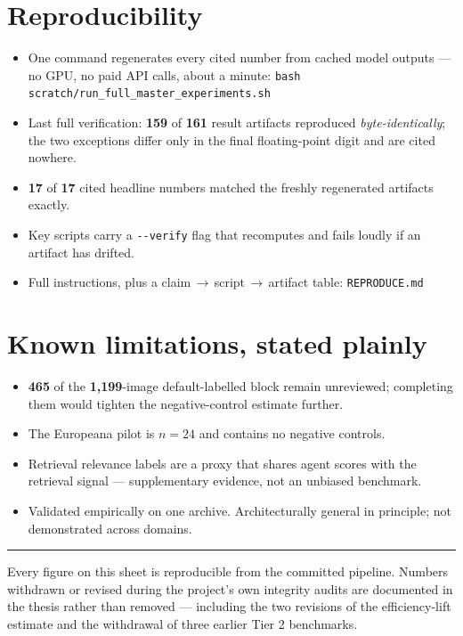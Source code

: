 \documentclass[10pt,a4paper]{article}
\newcommand{\num}[1]{\textbf{#1}}
\begin{document}
\section{Reproducibility}
\begin{itemize}
  \item One command regenerates every cited number from cached model outputs --- no GPU, no paid API calls, about a minute: \texttt{bash scratch/run\_full\_master\_experiments.sh}
  \item Last full verification: \num{159} of \num{161} result artifacts reproduced \emph{byte-identically}; the two exceptions differ only in the final floating-point digit and are cited nowhere.
  \item \num{17} of \num{17} cited headline numbers matched the freshly regenerated artifacts exactly.
  \item Key scripts carry a \texttt{-{}-verify} flag that recomputes and fails loudly if an artifact has drifted.
  \item Full instructions, plus a claim\,$\rightarrow$\,script\,$\rightarrow$\,artifact table: \texttt{REPRODUCE.md}
\end{itemize}

\section{Known limitations, stated plainly}
\begin{itemize}
  \item \num{465} of the \num{1{,}199}-image default-labelled block remain unreviewed; completing them would tighten the negative-control estimate further.
  \item The Europeana pilot is $n{=}24$ and contains no negative controls.
  \item Retrieval relevance labels are a proxy that shares agent scores with the retrieval signal --- supplementary evidence, not an unbiased benchmark.
  \item Validated empirically on one archive. Architecturally general in principle; not demonstrated across domains.
\end{itemize}

\vfill
\rule{\textwidth}{0.4pt}
{\footnotesize\color{PrismGray} Every figure on this sheet is reproducible from the committed pipeline. Numbers withdrawn or revised during the project's own integrity audits are documented in the thesis rather than removed --- including the two revisions of the efficiency-lift estimate and the withdrawal of three earlier Tier 2 benchmarks.}
\end{document}
